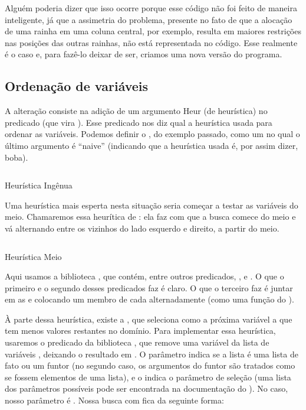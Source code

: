 Alguém poderia dizer que isso ocorre porque esse código não foi feito de maneira inteligente,
já que a assimetria do problema, presente no fato de que a alocação de uma rainha em uma coluna
central, por exemplo, resulta em maiores restrições nas posições das outras rainhas, não está
representada no código. Esse realmente é o caso e, para fazê-lo deixar de ser, criamos uma nova
versão do programa.

\subsection{Ordenação de variáveis}

A alteração consiste na adição de um argumento Heur (de heurística) no predicado 
(que vira ). Esse predicado nos diz qual a heurística usada para ordenar as variáveis.
Podemos definir o , do exemplo passado, como um  no qual o
último argumento é ``naive'' (indicando que a heurística usada é, por assim dizer, boba).

    \begin{listing}[!h]
    \inputminted{prolog}{../Exemplos/Cap11/prog2_queensHeurNaive.ecl}
    \caption{Heurística Ingênua}
    \end{listing}

Uma heurística mais esperta nesta situação seria começar a testar as variáveis do meio. Chamaremos
essa heurítica de : ela faz com que a busca comece do meio e vá alternando
entre os vizinhos do lado esquerdo e direito, a partir do meio.

    \begin{listing}[!h]
    \inputminted{prolog}{../Exemplos/Cap11/prog3_queensHeurMout.ecl}
    \caption{Heurística Meio}

    \end{listing}

Aqui usamos a biblioteca , que contém, entre outros predicados, ,
 e . O que o primeiro e o segundo desses predicados faz é
claro. O que o terceiro faz é juntar em  as  e
 colocando um membro de cada alternadamente (como uma função
 do ).

À parte dessa heurística, existe a , que seleciona como a próxima variável a
que tem menos valores restantes no domínio. Para implementar essa heurística, usaremos o predicado
da biblioteca  , que remove uma variável
 da lista de variáveis , deixando o resultado em . O parâmetro 
indica se a lista é uma lista de fato ou um funtor (no segundo caso, os argumentos do funtor são
tratados como se fossem elementos de uma lista), e o  indica o parâmetro de seleção (uma
lista dos parâmetros possíveis pode ser encontrada na documentação do \eclipse). No caso, nosso
parâmetro  é . Nossa busca com  fica da seguinte
forma:

